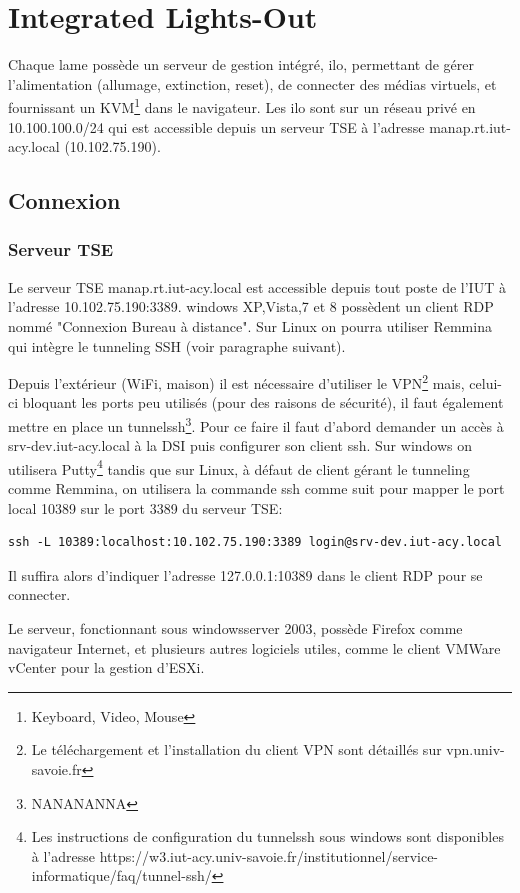 \documentclass[a4paper,oneside]{report}
\begin{document}
\section{Integrated Lights-Out}
Chaque lame possède un serveur de gestion intégré, \gls{ilo}, permettant de gérer l'alimentation (allumage, extinction, reset), de connecter des médias virtuels, et fournissant un KVM\footnote{Keyboard, Video, Mouse} dans le navigateur.
Les \gls{ilo} sont sur un réseau privé en 10.100.100.0/24 qui est accessible depuis un serveur TSE à l'adresse manap.rt.iut-acy.local (10.102.75.190).

\subsection{Connexion}
\subsubsection{Serveur TSE}
Le serveur TSE manap.rt.iut-acy.local est accessible depuis tout poste de l'IUT à l'adresse 10.102.75.190:3389. \gls{windows} XP,Vista,7 et 8 possèdent un client RDP nommé "Connexion Bureau à distance". Sur Linux on pourra utiliser Remmina qui intègre le tunneling SSH (voir paragraphe suivant).


Depuis l'extérieur (WiFi, maison) il est nécessaire d'utiliser le VPN\footnote{Le téléchargement et l'installation du client VPN sont détaillés sur vpn.univ-savoie.fr} mais, celui-ci bloquant les ports peu utilisés (pour des raisons de sécurité), il faut également mettre en place un \gls{tunnelssh}\footnote{NANANANNA}.
Pour ce faire il faut d'abord demander un accès à srv-dev.iut-acy.local à la DSI puis configurer son client \gls{ssh}.\newline
Sur \gls{windows} on utilisera Putty\footnote{Les instructions de configuration du \gls{tunnelssh} sous \gls{windows} sont disponibles à l'adresse https://w3.iut-acy.univ-savoie.fr/institutionnel/service-informatique/faq/tunnel-ssh/} tandis que sur Linux, à défaut de client gérant le tunneling comme Remmina, on utilisera la commande ssh comme suit pour mapper le port local 10389 sur le port 3389 du serveur TSE:
\label{tunnelingSsh}
\begin{verbatim}
ssh -L 10389:localhost:10.102.75.190:3389 login@srv-dev.iut-acy.local
\end{verbatim}
Il suffira alors d'indiquer l'adresse 127.0.0.1:10389 dans le client RDP pour se connecter.

Le serveur, fonctionnant sous \gls{windowsserver} 2003, possède Firefox comme navigateur Internet, et plusieurs autres logiciels utiles, comme le client VMWare vCenter pour la gestion d'ESXi.
\end{document}
